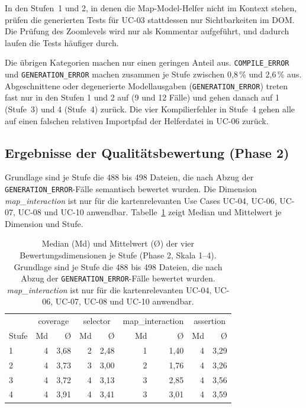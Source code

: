 In den Stufen~1 und 2, in denen die Map-Model-Helfer nicht im Kontext stehen, prüfen die generierten Tests für UC-03 stattdessen nur Sichtbarkeiten im \ac{DOM}. Die Prüfung des Zoomlevels wird nur als Kommentar aufgeführt, und dadurch laufen die Tests häufiger durch.

Die übrigen Kategorien machen nur einen geringen Anteil aus. \texttt{COMPILE\_ERROR} und \texttt{GENERATION\_ERROR} machen zusammen je Stufe zwischen 0,8\,\% und 2,6\,\% aus. Abgeschnittene oder degenerierte Modellausgaben (\texttt{GENERATION\_ERROR}) treten fast nur in den Stufen 1 und 2 auf (9 und 12 Fälle) und gehen danach auf 1 (Stufe~3) und 4 (Stufe~4) zurück. Die vier Kompilierfehler in Stufe~4 gehen alle auf einen falschen relativen Importpfad der Helferdatei in UC-06 zurück.

\subsection{Ergebnisse der Qualitätsbewertung (Phase 2)}

Grundlage sind je Stufe die 488 bis 498 Dateien, die nach Abzug der \texttt{GENERATION\_ERROR}-Fälle semantisch bewertet wurden. Die Dimension \emph{map\_interaction} ist nur für die kartenrelevanten Use Cases UC-04, UC-06, UC-07, UC-08 und UC-10 anwendbar. Tabelle~\ref{tab:phase2_dimensionen} zeigt Median und Mittelwert je Dimension und Stufe.

\begin{table}[H]
    \centering
    \caption[Bewertungsdimensionen je Stufe]{Median (Md) und Mittelwert (Ø) der vier Bewertungsdimensionen je Stufe (Phase 2, Skala 1--4). Grundlage sind je Stufe die 488 bis 498 Dateien, die nach Abzug der \texttt{GENERATION\_ERROR}-Fälle bewertet wurden. \emph{map\_interaction} ist nur für die kartenrelevanten UC-04, UC-06, UC-07, UC-08 und UC-10 anwendbar.}
    \label{tab:phase2_dimensionen}
    \begin{tabular}{lrrrrrrrr}
        \toprule
        & \multicolumn{2}{c}{coverage} & \multicolumn{2}{c}{selector} & \multicolumn{2}{c}{map\_interaction} & \multicolumn{2}{c}{assertion} \\
        Stufe & Md & Ø & Md & Ø & Md & Ø & Md & Ø \\
        \midrule
        1 & 4 & 3{,}68 & 2 & 2{,}48 & 1 & 1{,}40 & 4 & 3{,}29 \\
        2 & 4 & 3{,}73 & 3 & 3{,}00 & 2 & 1{,}76 & 4 & 3{,}26 \\
        3 & 4 & 3{,}72 & 4 & 3{,}13 & 3 & 2{,}85 & 4 & 3{,}56 \\
        4 & 4 & 3{,}91 & 4 & 3{,}41 & 3 & 3{,}01 & 4 & 3{,}59 \\
        \bottomrule
    \end{tabular}
\end{table}

